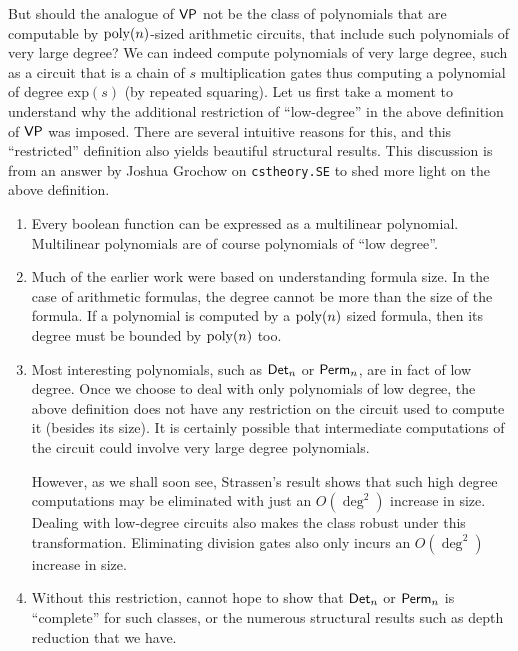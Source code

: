 But should the analogue of $\mathsf{VP}$ not be the class of polynomials that are computable by $\mathrm{poly}(n)$-sized arithmetic circuits, that include such polynomials of very large degree? We can indeed compute polynomials of very large degree, such as a circuit that is a chain of $s$ multiplication gates thus computing a polynomial of degree $\mathrm{exp}(s)$ (by repeated squaring).  Let us first take a moment to understand why the additional restriction of ``low-degree'' in the above definition of $\mathsf{VP}$ was imposed. There are several intuitive reasons for this, and this ``restricted'' definition also yields beautiful structural results. This discussion is from an answer by Joshua Grochow on \texttt{cstheory.SE} \cite{gro:SE} to shed more light on the above definition. 

\begin{enumerate}

\item Every boolean function can be expressed as a multilinear polynomial. Multilinear polynomials are of course polynomials of ``low degree''. 

\item Much of the earlier work were based on understanding formula size. In the case of arithmetic formulas, the degree cannot be more than the size of the formula. If a polynomial is computed by a $\mathrm{poly}(n)$ sized formula, then its degree must be bounded by $\mathrm{poly}(n)$ too. 

\item Most interesting polynomials, such as $\mathsf{Det}_n$ or $\mathsf{Perm}_n$, are in fact of low degree. Once we choose to deal with only polynomials of low degree, the above definition does not have any restriction on the circuit used to compute it (besides its size). It is certainly possible that intermediate computations of the circuit could involve very large degree polynomials. 

However, as we shall soon see, Strassen's result shows that such high degree computations may be eliminated with just an $O(\deg^2)$ increase in size. Dealing with low-degree circuits also makes the class robust under this transformation. Eliminating division gates also only incurs an $O(\deg^2)$ increase in size. 

\item Without this restriction, cannot hope to show that $\mathsf{Det}_n$ or $\mathsf{Perm}_n$ is ``complete'' for such classes, or the numerous structural results such as depth reduction that we have. 

\end{enumerate}

